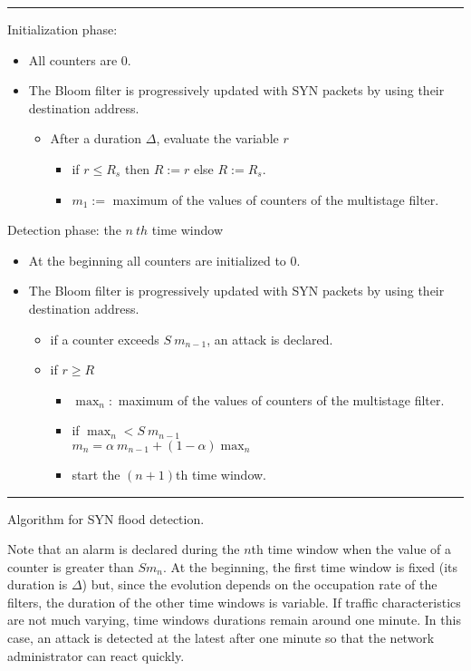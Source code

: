 \documentclass{amsart}
\begin{document}
\begin{table}
\hrule
Initialization phase:
\begin{itemize}
\item All counters are $0$. 
\item The Bloom  filter is progressively updated with SYN packets by using their
  destination address. 
	\begin{itemize}
	\item After a duration $\Delta$, evaluate the variable $r$
		\begin{itemize}
		\item if $r \leq R_s$ then $R:=r$ else $R:=R_s$.
		\item  $m_1 :=$ maximum of the values of counters of the multistage filter.
		\end{itemize}
	\end{itemize}	
\end{itemize}	
Detection phase: the $n\ th$ time window
\begin{itemize}
\item At the beginning all counters are initialized to $0$. 
\item The Bloom  filter is progressively updated with SYN packets by using their   destination address. 
	\begin{itemize}
	\item if a counter exceeds $S\ m_{n-1}$, an attack is declared.
	\item if $r \geq R$
		\begin{itemize}
		\item $\max_n :$ maximum of the values of counters of the multistage filter.
		\item if $\max_n<S\ m_{n-1}$ \\
        $m_n = \alpha\ m_{n-1}+(1-\alpha)\max_n$
        \item start the $(n+1)$th time window.
		\end{itemize}
	\end{itemize}	
\end{itemize}
\hrule
\caption{Algorithm for SYN flood detection.\label{alogattack}}
\end{table}

Note that an alarm is declared during the $n$th time window when the value of a counter is
greater than $Sm_n$. At the beginning, the first time
window is fixed (its duration is $\Delta$) but, since the evolution depends on the occupation rate of
the filters, the duration of the other time windows is variable.  If traffic characteristics are not much varying,
time windows durations remain around one minute. In this case, an attack is detected
at the latest after one minute  so that the network administrator can react quickly.
\end{document}
